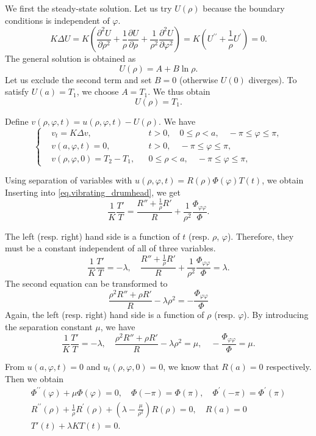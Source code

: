 We first the steady-state solution. Let us try $U(\rho)$ because the boundary conditions is independent of $\varphi$.
$$
K \Delta U=K\left(\frac{\partial^2 U}{\partial \rho^2}+\frac{1}{\rho} \frac{\partial U}{\partial \rho}+\frac{1}{\rho^2} \frac{\partial^2 U}{\partial \varphi^2}\right)=K\left(U^{\prime \prime}+\frac{1}{\rho} U^{\prime}\right)=0 .
$$
The general solution is obtained as
$$
U(\rho)=A+B \ln \rho .
$$
Let us exclude the second term and set $B=0$ (otherwise $U(0)$ diverges). To satisfy $U\left(a\right)=T_1$, we choose $A=T_1$. We thus obtain
$$
U(\rho)=T_1 .
$$

Define $v(\rho, \varphi, t)=u(\rho, \varphi, t)-U(\rho)$. We have
$$
\left\{\begin{aligned}
&v_t=K \Delta v, && t>0, \quad 0 \leq \rho<a, \quad-\pi \leq \varphi \leq \pi, 
\\
&v\left(a, \varphi, t\right)=0, && t>0, \quad-\pi \leq \varphi \leq \pi, 
\\
&v(\rho, \varphi, 0)=T_2-T_1, && 0 \leq \rho<a, \quad-\pi \leq \varphi \leq \pi,
\end{aligned}\right.
$$

Using separation of variables with $u(\rho, \varphi, t)=R(\rho) \Phi(\varphi) T(t)$, we obtain
Inserting into \eqref{eq.vibrating_drumhead}, we get
\[
    \frac{1}{K}\frac{T'}{T} = \frac{R''+\frac{1}{\rho} R'}{R} + \frac{1}{\rho^2}\frac{\Phi_{\varphi \varphi}}{\Phi}.
\]

The left (resp. right) hand side is a function of $t$ (resp. $\rho$, $\varphi$). Therefore, they must be a constant independent of all of three variables.
\[
    \frac{1}{K}\frac{T'}{T} = -\lambda,\quad \frac{R''+\frac{1}{\rho} R'}{R} + \frac{1}{\rho^2}\frac{\Phi_{\varphi \varphi}}{\Phi} = \lambda.
\]
The second equation can be transformed to 
\[
    \frac{\rho^2 R'' + \rho R'}{R} - \lambda \rho^2 = - \frac{\Phi_{\varphi \varphi}}{\Phi}
\]
Again, the left (resp. right) hand side is a function of $\rho$ (resp. $\varphi$). By introducing the separation constant $\mu$, we have
\[
    \frac{1}{K}\frac{T'}{T} = -\lambda,\quad \frac{\rho^2 R'' + \rho R'}{R} - \lambda \rho^2 = \mu, \quad - \frac{\Phi_{\varphi \varphi}}{\Phi} = \mu.
\]

From $u(a, \varphi, t)=0$ and $u_t(\rho, \varphi, 0)=0$, we know that $R(a) = 0$ respectively. Then we obtain
\begin{equation}\label{eq.solve_heat_disk_1}
\begin{array}{l}
    \Phi^{\prime \prime}(\varphi)+\mu \Phi(\varphi)=0, \quad \Phi(-\pi)=\Phi(\pi), \quad \Phi^{\prime}(-\pi)=\Phi^{\prime}(\pi) \\
    R^{\prime \prime}(\rho)+\frac{1}{\rho} R^{\prime}(\rho)+\left(\lambda-\frac{\mu}{\rho^2}\right) R(\rho)=0, \quad R(a)=0 \\
    T'(t)+\lambda K T(t)=0.
\end{array}
\end{equation}



